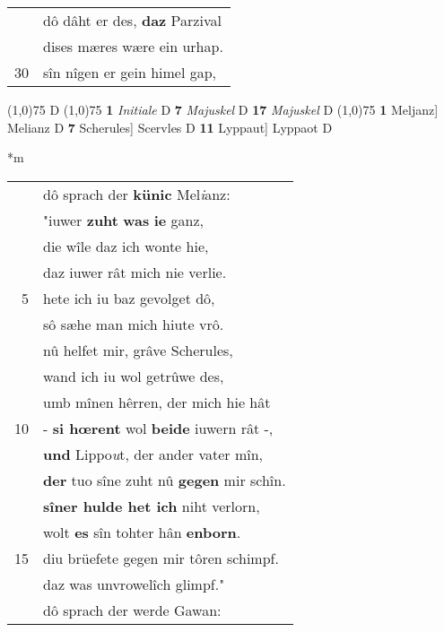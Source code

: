 \documentclass[8pt,a4paper,notitlepage]{article}
\begin{document}
\begin{table}[ht]
\begin{minipage}[t]{0.5\linewidth}
\begin{tabular}{rl}
 & dô dâht er des, \textbf{daz} Parzival\\ 
 & dises mæres wære ein urhap.\\ 
30 & sîn nîgen er gein himel gap,\\ 
\end{tabular}
\scriptsize
\line(1,0){75} \newline
D \newline
\line(1,0){75} \newline
\textbf{1} \textit{Initiale} D  \textbf{7} \textit{Majuskel} D  \textbf{17} \textit{Majuskel} D  \newline
\line(1,0){75} \newline
\textbf{1} Meljanz] Melianz D \textbf{7} Scherules] Scervles D \textbf{11} Lyppaut] Lyppaot D \newline
\end{minipage}
\hspace{0.5cm}
\begin{minipage}[t]{0.5\linewidth}
\small
\begin{center}*m
\end{center}
\begin{tabular}{rl}
 & dô sprach der \textbf{künic} Mel\textit{i}anz:\\ 
 & "iuwer \textbf{zuht} \textbf{was} \textbf{ie} ganz,\\ 
 & die wîle daz ich wonte hie,\\ 
 & daz iuwer rât mich nie verlie.\\ 
5 & hete ich iu baz gevolget dô,\\ 
 & sô sæhe man mich hiute vrô.\\ 
 & nû helfet mir, grâve Scherules,\\ 
 & wand ich iu wol getrûwe des,\\ 
 & umb mînen hêrren, der mich hie hât\\ 
10 & - \textbf{si hœrent} wol \textbf{beide} iuwern rât -,\\ 
 & \textbf{und} Lippo\textit{u}t, der ander vater mîn,\\ 
 & \textbf{der} tuo sîne zuht nû \textbf{gegen} mir schîn.\\ 
 & \textbf{sîner hulde het ich} niht verlorn,\\ 
 & wolt \textbf{es} sîn tohter hân \textbf{enborn}.\\ 
15 & diu brüefete gegen mir tôren schimpf.\\ 
 & daz was unvrowelîch glimpf."\\ 
 & dô sprach der werde Gawan:\\ 

\end{tabular}
\end{minipage}
\end{table}
\end{document}
